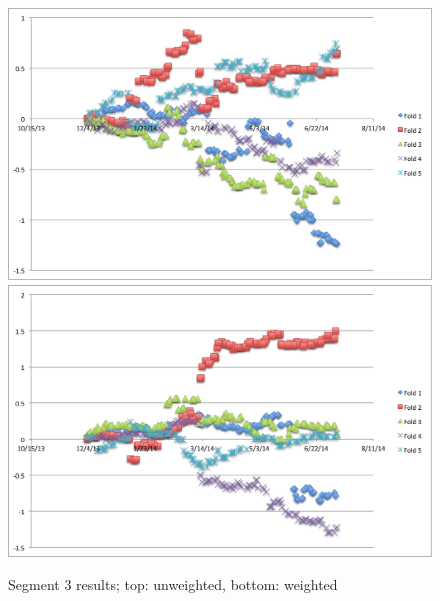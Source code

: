 \documentclass[11pt,letterpaper]{article}
\begin{document}
\begin{figure}
	\centering
	\includegraphics[width=14cm]{images/unweighted-exp-2.png}
    	\qquad
    	\includegraphics[width=14cm]{images/weighted-exp-2.png}
    	\caption{Segment 3 results; top: unweighted, bottom: weighted}%
    	\label{fig:3}
\end{figure}
\end{document}
